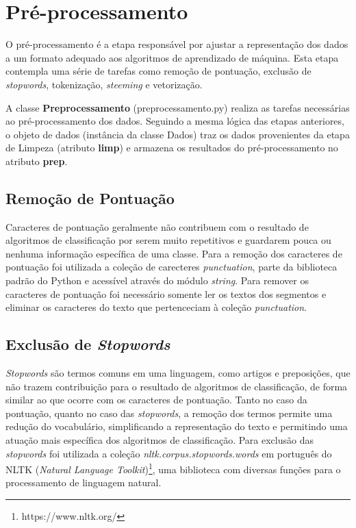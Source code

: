 \section{Pré-processamento}

O pré-processamento é a etapa responsável por ajustar a representação dos dados a um formato adequado aos algoritmos de aprendizado de máquina. Esta etapa contempla uma série de tarefas como remoção de pontuação, exclusão de \textit{stopwords}, tokenização,  \textit{steeming} e vetorização.

A classe \textbf{Preprocessamento} (preprocessamento.py) realiza as tarefas necessárias ao pré-processamento dos dados. Seguindo a mesma lógica das etapas anteriores, o objeto de dados (instância da classe Dados) traz os dados provenientes da etapa de Limpeza (atributo \textbf{limp}) e armazena os resultados do pré-processamento no atributo \textbf{prep}.  

\subsection{Remoção de Pontuação}

Caracteres de pontuação geralmente não contribuem com o resultado de algoritmos de classificação por serem muito repetitivos e guardarem pouca ou nenhuma informação específica de uma classe. Para a remoção dos caracteres de pontuação foi utilizada a coleção de carecteres \textit{punctuation}, parte da biblioteca padrão do Python e acessível através do módulo \textit{string}. Para remover os caracteres de pontuação foi necessário somente ler os textos dos segmentos e eliminar os caracteres do texto que pertenceciam à coleção \textit{punctuation}.

\subsection{Exclusão de \textit{Stopwords}}

\textit{Stopwords} são termos comuns em uma linguagem, como artigos e preposições, que não trazem contribuição para o resultado de algoritmos de classificação, de forma similar ao que ocorre com os caracteres de pontuação. Tanto no caso da pontuação, quanto no caso das \textit{stopwords}, a remoção dos termos permite uma redução do vocabulário, simplificando a representação do texto e permitindo uma atuação mais específica dos algoritmos de classificação. Para exclusão das \textit{stopwords} foi utilizada a coleção \textit{nltk.corpus.stopwords.words} em português do NLTK (\textit{Natural Language Toolkit})\footnote{https://www.nltk.org/}, uma biblioteca com diversas funções para o processamento de linguagem natural.

